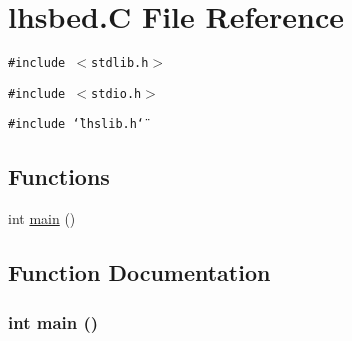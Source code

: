 \hypertarget{lhsbed_8C}{
\section{lhsbed.C File Reference}
\label{lhsbed_8C}
}
{\tt \#include $<$stdlib.h$>$}\par
{\tt \#include $<$stdio.h$>$}\par
{\tt \#include \char`\"{}lhslib.h\char`\"{}}\par
\subsection*{Functions}
\begin{CompactItemize}
\item 
int \hyperlink{lhsbed_8C_a0}{main} ()
\end{CompactItemize}


\subsection{Function Documentation}
\hypertarget{lhsbed_8C_a0}{
\subsubsection[main]{\setlength{\rightskip}{0pt plus 5cm}int main ()}}
\label{lhsbed_8C_a0}


